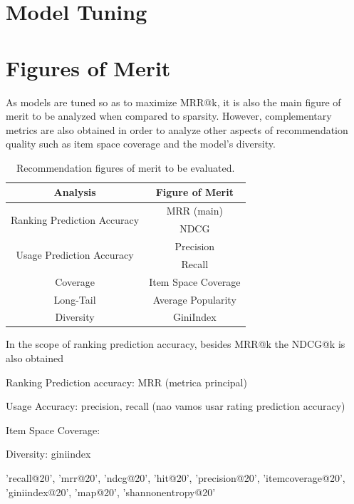 \section{Model Tuning}


\section{Figures of Merit}

As models are tuned so as to maximize MRR@k, it is also the main figure of merit to be analyzed when compared to sparsity. However, complementary metrics are also obtained in order to analyze other aspects of recommendation quality such as item space coverage and the model's diversity. 

% 
\begin{table}[h]
\centering
\begin{tabular}{@{}cc@{}}
\toprule
\textbf{Analysis}                            & \textbf{Figure of Merit} \\ \midrule
\multirow{2}{*}{Ranking Prediction Accuracy} & MRR (main)               \\
                                             & NDCG                     \\ \midrule
\multirow{2}{*}{Usage Prediction Accuracy}   & Precision                \\
                                             & Recall                   \\ \midrule
Coverage                                     & Item Space Coverage       \\ \midrule
Long-Tail                                    & Average Popularity       \\ \midrule
Diversity                                    & GiniIndex                \\ \bottomrule
\end{tabular}
\caption{Recommendation figures of merit to be evaluated.}
\label{tab:fig_merit}
\end{table}
In the scope of ranking prediction accuracy, besides MRR@k the NDCG@k is also obtained

Ranking Prediction accuracy: MRR (metrica principal)

Usage Accuracy: precision, recall (nao vamos usar rating prediction accuracy)

Item Space Coverage: 

Diversity: giniindex

'recall@20', 'mrr@20', 'ndcg@20', 'hit@20', 'precision@20', 'itemcoverage@20', 'giniindex@20', 'map@20', 'shannonentropy@20'